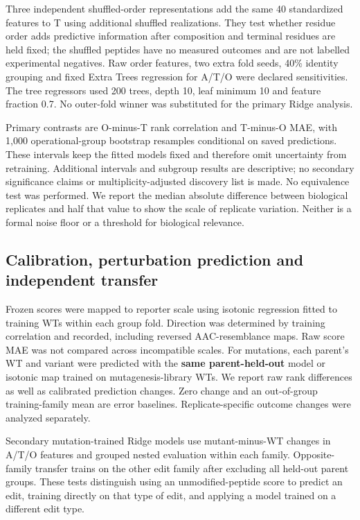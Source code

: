 \documentclass[11pt,a4paper]{article}
\begin{document}
Three independent shuffled-order representations add the same 40 standardized
features to T using additional shuffled realizations. They test whether residue order adds predictive information after composition and terminal residues are held fixed; the shuffled
peptides have no measured outcomes and are not labelled experimental negatives.
Raw order features, two extra fold seeds, 40\% identity grouping and fixed
Extra Trees regression for A/T/O were declared sensitivities. The tree
regressors used 200 trees, depth 10, leaf minimum 10 and feature fraction 0.7.
No outer-fold winner was substituted for the primary Ridge analysis.

Primary contrasts are O-minus-T rank correlation and T-minus-O MAE, with
1,000 operational-group bootstrap resamples conditional on saved predictions.
These intervals keep the fitted models fixed and therefore omit uncertainty from retraining. Additional
intervals and subgroup results are descriptive; no secondary significance
claims or multiplicity-adjusted discovery list is made. No equivalence test
was performed. We report the median absolute difference between biological replicates and half that value to show the scale of replicate variation. Neither is a formal noise floor or a threshold for biological relevance.

\subsection{Calibration, perturbation prediction and independent transfer}
Frozen scores were mapped to reporter scale using isotonic regression fitted
to training WTs within each group fold. Direction was determined by training
correlation and recorded, including reversed AAC-resemblance maps. Raw score
MAE was not compared across incompatible scales. For mutations, each parent's
WT and variant were predicted with the \textbf{same parent-held-out} model or
isotonic map trained on mutagenesis-library WTs. We report raw rank differences
as well as calibrated prediction changes. Zero change and an out-of-group
training-family mean are error baselines. Replicate-specific outcome changes
were analyzed separately.

Secondary mutation-trained Ridge models use mutant-minus-WT changes in A/T/O
features and grouped nested evaluation within each family. Opposite-family
transfer trains on the other edit family after excluding all held-out parent
groups. These tests distinguish using an unmodified-peptide score to predict an edit, training directly on that type of edit, and applying a model trained on a different edit type.
\end{document}
